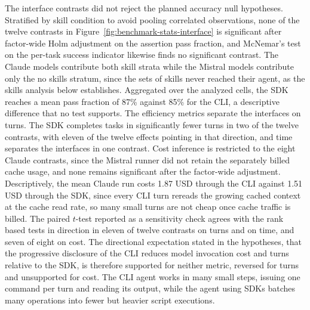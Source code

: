 \documentclass[
english,                 %
bibtex,                  %
]{kththesis}
\numberwithin{listing}{chapter}
\begin{document}
The interface contrasts did not reject the planned accuracy null hypotheses. Stratified by skill condition to avoid pooling correlated observations, none of the twelve contrasts in Figure~\ref{fig:benchmark-stats-interface} is significant after factor-wide Holm adjustment on the assertion pass fraction, and McNemar's test on the per-task success indicator likewise finds no significant contrast. The Claude models contribute both skill strata while the Mistral models contribute only the no skills stratum, since the sets of skills never reached their agent, as the skills analysis below establishes. Aggregated over the analyzed cells, the \gls{SDK} reaches a mean pass fraction of 87\% against 85\% for the \gls{CLI}, a descriptive difference that no test supports. The efficiency metrics separate the interfaces on turns. The \gls{SDK} completes tasks in significantly fewer turns in two of the twelve contrasts, with eleven of the twelve effects pointing in that direction, and time separates the interfaces in one contrast. Cost inference is restricted to the eight Claude contrasts, since the Mistral runner did not retain the separately billed cache usage, and none remains significant after the factor-wide adjustment. Descriptively, the mean Claude run costs 1.87 \gls{USD} through the \gls{CLI} against 1.51 \gls{USD} through the \gls{SDK}, since every \gls{CLI} turn rereads the growing cached context at the cache read rate, so many small turns are not cheap once cache traffic is billed. The paired $t$-test reported as a sensitivity check agrees with the rank based tests in direction in eleven of twelve contrasts on turns and on time, and seven of eight on cost. The directional expectation stated in the hypotheses, that the progressive disclosure of the \gls{CLI} reduces model invocation cost and turns relative to the \gls{SDK}, is therefore supported for neither metric, reversed for turns and unsupported for cost. The \gls{CLI} agent works in many small steps, issuing one command per turn and reading its output, while the agent using \glspl{SDK} batches many operations into fewer but heavier script executions.
\end{document}
